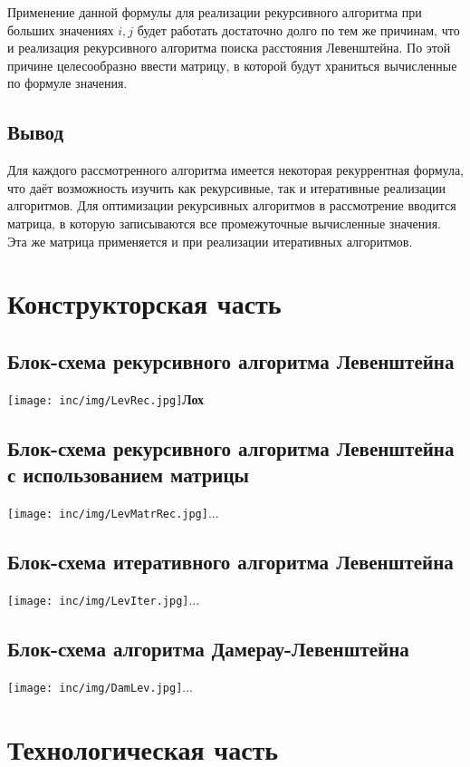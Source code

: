 \documentclass[12pt]{report}
\begin{document}
Применение данной формулы для реализации рекурсивного алгоритма при больших значениях $i, j$ будет работать достаточно долго по тем же причинам, что и реализация рекурсивного алгоритма поиска расстояния Левенштейна. По этой причине целесообразно ввести матрицу, в которой будут храниться вычисленные по формуле значения.

\section{Вывод}
Для каждого рассмотренного алгоритма имеется некоторая рекуррентная формула, что даёт возможность изучить как рекурсивные, так и итеративные реализации алгоритмов. Для оптимизации рекурсивных алгоритмов в рассмотрение вводится матрица, в которую записываются все промежуточные вычисленные значения. Эта же матрица применяется и при реализации итеративных алгоритмов.

\newpage

\chapter{Конструкторская часть}
\section{Блок-схема рекурсивного алгоритма Левенштейна}
\texttt{[image: inc/img/LevRec.jpg]}{\newline \textbf{Лох}}
\section{Блок-схема рекурсивного алгоритма Левенштейна с использованием матрицы}
\texttt{[image: inc/img/LevMatrRec.jpg]}{...}
\section{Блок-схема итеративного алгоритма Левенштейна}
\texttt{[image: inc/img/LevIter.jpg]}{...}
\section{Блок-схема алгоритма Дамерау-Левенштейна}
\texttt{[image: inc/img/DamLev.jpg]}{...}

\chapter{Технологическая часть}
\end{document}
